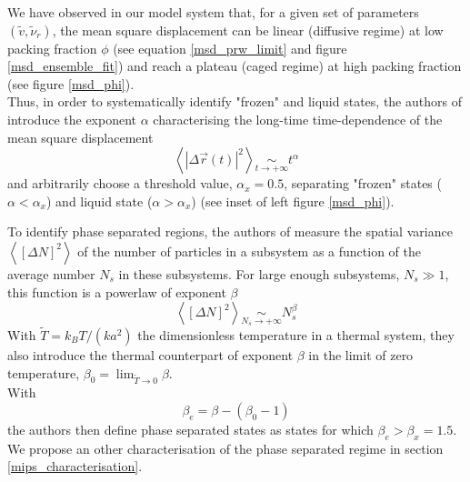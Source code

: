 \documentclass[class=report, float=false, crop=false]{standalone}
\begin{document}
We have observed in our model system that, for a given set of parameters $(\tilde{v}, \tilde{\nu}_r)$, the mean square displacement can be linear (diffusive regime) at low packing fraction $\phi$ (see equation \ref{msd_prw_limit} and figure \ref{msd_ensemble_fit}) and reach a plateau (caged regime) at high packing fraction (see figure \ref{msd_phi}).\\

Thus, in order to systematically identify "frozen" and liquid states, the authors of \cite{fily2014freezing} introduce the exponent $\alpha$ characterising the long-time time-dependence of the mean square displacement
\begin{equation}
\left<|\Delta\vec{r}(t)|^2\right> \underset{t \rightarrow +\infty}{\sim} t^{\alpha}
\label{exponent_alpha}
\end{equation}
and arbitrarily choose a threshold value, $\alpha_x = 0.5$, separating "frozen" states ($\alpha < \alpha_x$) and liquid state ($\alpha > \alpha_x$) (see inset of left figure \ref{msd_phi}).


To identify phase separated regions, the authors of \cite{fily2014freezing} measure the spatial variance $\left<[\Delta N]^2\right>$ of the number of particles in a subsystem as a function of the average number $N_s$ in these subsystems. For large enough subsystems, $N_s \gg 1$, this function is a powerlaw of exponent $\beta$
\begin{equation}
\left<[\Delta N]^2\right> \underset{N_s \rightarrow +\infty}{\sim} N_s^{\beta}
\label{exponent_beta}
\end{equation}
With $\tilde{T} = k_BT/(ka^2)$ the dimensionless temperature in a thermal system, they also introduce the thermal counterpart of exponent $\beta$ in the limit of zero temperature, $\beta_0 = \lim_{\tilde{T} \rightarrow 0} \beta$.\\

With
\begin{equation}
\beta_e = \beta - (\beta_0 - 1)
\label{exponent_betae}
\end{equation}
the authors then define phase separated states as states for which $\beta_e > \beta_x = 1.5$.\\

We propose an other characterisation of the phase separated regime in section \ref{mips_characterisation}.

\end{document}
